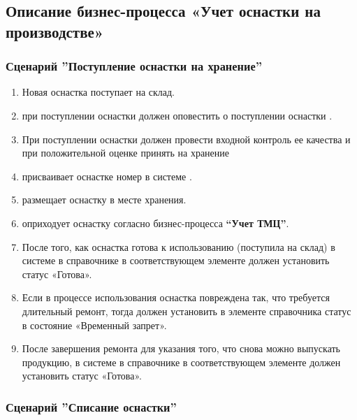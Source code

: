\subsection{Описание бизнес-процесса «Учет оснастки на производстве»}

\subsubsection{Сценарий ''Поступление оснастки на хранение''}
\label{bp:tool_1}

\begin{enumerate}

\item Новая оснастка поступает на склад. 
\item \kladovshik при поступлении оснастки должен оповестить о поступлении оснастки \preproductionspecialist.
\item 	При поступлении оснастки \preproductionspecialist должен провести входной контроль ее качества и при положительной оценке принять на хранение
\item 	\preproductionspecialist присваивает оснастке номер в системе \gofro.
\item 	\preproductionspecialist размещает оснастку в месте хранения.
\item 	\kladovshik оприходует оснастку согласно бизнес-процесса \textbf{“Учет ТМЦ”}.
\item 	После того, как оснастка готова к использованию (поступила на склад) \preproductionspecialist в системе \gofro в справочнике  в соответствующем элементе должен установить статус «Готова».
\item 	Если в процессе использования оснастка повреждена так, что требуется длительный ремонт, тогда \preproductionspecialist должен установить в элементе справочника  статус в состояние «Временный запрет». 
\item 	После завершения ремонта для указания того, что снова можно выпускать продукцию, \preproductionspecialist в системе \gofro в справочнике  в соответствующем элементе должен установить статус «Готова».
\end{enumerate}

\subsubsection{Сценарий ''Списание оснастки''}
\label{bp:tool_2}

